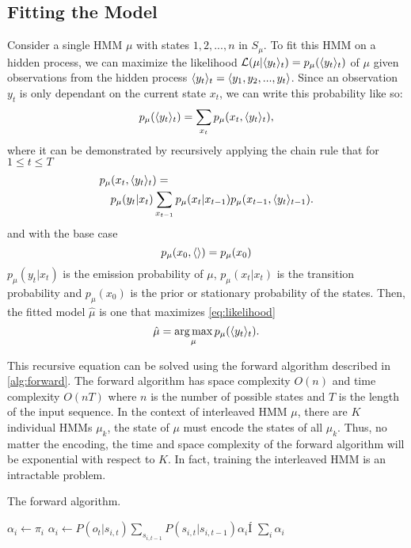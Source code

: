 \subsection{Fitting the Model}

Consider a single HMM \(\mu\) with states \(1, 2, ...,n\) in \(S_\mu\). To fit this HMM on a hidden process, we can maximize the likelihood \(\mathcal{L}(\mu | \langle y_t\rangle_t) = p_\mu(\langle y_t\rangle_t)\) of \(\mu\) given observations from the hidden process \(\langle y_t\rangle_t = \langle y_1, y_2, ..., y_t\rangle\). Since an observation \(y_t\) is only dependant on the current state \(x_t\), we can write this probability like so:
\begin{equation}\label{eq:likelihood}
    p_\mu(\langle y_t\rangle_t) = \sum_{x_t} p_\mu(x_t, \langle y_t\rangle_t),
\end{equation}
where it can be demonstrated by recursively applying the chain rule that for \(1
\leq t \leq T\)
\begin{equation}
    \begin{multlined}
        p_\mu(x_t, \seq{y_t}_t) = \\
        p_\mu(y_t|x_t) \sum_{x_{t-1}} p_\mu(x_t|x_{t-1}) p_\mu(x_{t-1}, \seq{y_t}_{t-1}).
    \end{multlined}
\end{equation}
and with the base case
\begin{equation}\label{eq:max_likelihood}
    p_\mu(x_0, \langle\rangle) = p_\mu(x_0)
\end{equation}
\(p_\mu(y_t|x_t)\) is the emission probability of \(\mu\), \(p_\mu(x_t | x_t)\) is the transition probability and \(p_\mu(x_0)\) is the prior or stationary probability of the states. Then, the fitted model \(\hat{\mu}\) is one that maximizes \cref{eq:likelihood}
\begin{equation}
    \label{eq:argmax_observation}
    \hat{\mu} = \operatorname*{arg\,max}_{\mu} p_\mu(\langle y_t\rangle_t).
\end{equation}

This recursive equation can be solved using the forward algorithm described in \cref{alg:forward}. The forward algorithm has space complexity \(O(n)\)  and time complexity \(O(nT)\) where \(n\) is the number of possible states and \(T\) is the length of the input sequence. In the context of interleaved HMM \(\mu\), there are \(K\) individual HMMs \(\mu_k\), the state of \(\mu\) must encode the states of all \(\mu_k\). Thus, no matter the encoding, the time and space complexity of the forward algorithm will be exponential with respect to \(K\). In fact, training the interleaved HMM is an intractable problem\cite{Landwehr2008-vw}.
\begin{algorithm}[H]
    \caption{The forward algorithm.}\label{alg:forward}
    \begin{algorithmic}[1]
        \State $\alpha_i \gets \pi_i$
        \EndFor
        \State $\alpha_i \gets P(o_t|s_{i,t}) \sum_{s_{i, t-1}} P(s_{i, t} | s_{i, t-1}) \alpha_i$Í
        \EndFor
        \EndFor
        \State \Return $\sum_{i} \alpha_i$
        \EndFunction
    \end{algorithmic}
\end{algorithm}

